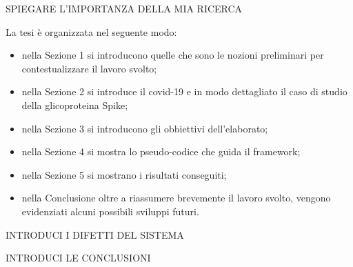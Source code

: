 SPIEGARE L'IMPORTANZA DELLA MIA RICERCA

La tesi è organizzata nel seguente modo:
\vspace{10pt}
\begin{itemize}
	\item nella Sezione 1 si introducono quelle che sono le nozioni preliminari per contestualizzare il lavoro svolto;
	\vspace{5pt}
	\item nella Sezione 2 si introduce il covid-19 e in modo dettagliato il caso di studio della glicoproteina Spike;
	\vspace{5pt}
	\item nella Sezione 3 si introducono gli obbiettivi dell'elaborato;
	\vspace{5pt}
	\item nella Sezione 4 si mostra lo pseudo-codice che guida il framework;
	\vspace{5pt}
	\item nella Sezione 5 si mostrano i risultati conseguiti;
	\vspace{5pt}
	\item nella Conclusione oltre a riassumere brevemente il lavoro svolto, vengono evidenziati alcuni possibili sviluppi futuri. 
	\vspace{5pt}
\end{itemize}

INTRODUCI I DIFETTI DEL SISTEMA

INTRODUCI LE CONCLUSIONI


